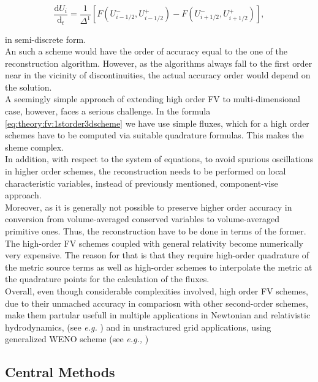 \documentclass[11pt,a4paper,headinclude=true,DIV=14,BCOR=8mm,chapterprefix,listof=totoc,twoside,openright,abstracton]{scrbook}
\begin{document}
\begin{equation}
    \frac{\text{d}U_i}{\text{d}_t} = \frac{1}{\Delta^1}[F(U^{-}_{i-1/2},U^{+}_{i-1/2}) - F(U^{-}_{i+1/2},U^{+}_{i+1/2})],
\end{equation}

in semi-discrete form. \\
An such a scheme would have the order of accuracy equal to the one of the reconstruction algorithm. However, as the algorithms always fall to the first order near in the vicinity of discontinuities, the actual accuracy order would depend on the solution. \\

A seemingly simple approach of extending high order FV to multi-dimensional case, however, faces a serious challenge. In the formula \ref{eq:theory:fv:1storder3dscheme} we have use simple fluxes, which for a high order schemes have to be computed via suitable quadrature formulas. This makes the sheme complex. \\

In addition, with respect to the system of equations, to avoid spurious oscillations in higher order schemes, the reconstruction needs to be performed on local characteristic variables, instead of previously mentioned, component-vise approach. \\

Moreover, as it is generally not possible to preserve higher order accuracy in conversion from volume-averaged conserved variables to volume-averaged primitive ones. Thus, the reconstruction have to be done in terms of the former. \\

The high-order FV schemes coupled with general relativity become numerically very expensive. The reason for that is that they require high-order quadrature of the metric source terms as well as high-order
schemes to interpolate the metric at the quadrature points for the calculation of the fluxes. \\

Overall, even though considerable complexities involved, high order FV schemes, due to their unmached accuracy in compariosn with other second-order schemes, make them partular usefull in multiple applications in Newtonian and relativistic hydrodynamics, (see \textit{e.g.} \cite{Tchekhovskoy:2007zn}) and in unstractured grid applications, using generalized WENO scheme (see \textit{e.g.,} \cite{Dumbser:2007})

\subsection{Central Methods}
\end{document}
